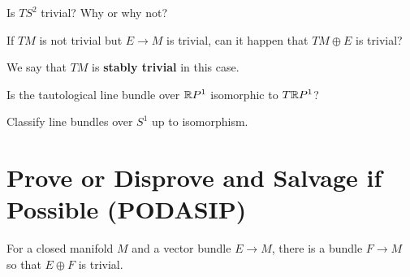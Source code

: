 \documentclass{homework}
\begin{document}
\begin{problem}
 Is $TS^2$ trivial?   Why or why not?
\end{problem}

\begin{problem} If $TM$ is not trivial but $E \to M$ is trivial, can
  it happen that $TM \oplus E$ is trivial?

  We say that $TM$ is
\textbf{stably trivial} in this case.
\end{problem}

\begin{problem} Is the tautological line bundle over $\mathbb{R}P^1$
isomorphic to $T\mathbb{R}P^1$?
\end{problem}

\begin{problem}
  Classify line bundles over $S^1$ up to isomorphism.
\end{problem}

\section{Prove or Disprove and Salvage if Possible (PODASIP)}

\begin{problem}
For a closed manifold $M$ and a vector bundle $E \to M$, there is a bundle $F \to M$ so that $E \oplus F$ is trivial.
\end{problem}
\end{document}
